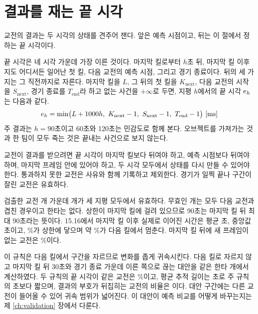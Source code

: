 \section{결과를 재는 끝 시각}
\label{sec:eng-endpoint}

교전의 결과는 두 시각의 상태를 견주어 잰다. 앞은 예측 시점이고, 뒤는 이 절에서 정하는 끝 시각이다.

끝 시각은 네 시각 가운데 가장 이른 것이다. 마지막 킬로부터 $h$초 뒤, 마지막 킬 이후 지도 어디서든 일어난 첫 킬, 다음 교전의 예측 시점, 그리고 경기 종료이다. 뒤의 세 가지는 그 직전까지로 자른다. 마지막 킬을 $L$, 그 뒤의 첫 킬을 $K_{\mathrm{next}}$, 다음 교전의 시작을 $S_{\mathrm{next}}$, 경기 종료를 $T_{\mathrm{end}}$라 하고 없는 사건을 $+\infty$로 두면, 지평 $h$에서의 끝 시각 $e_{h}$는 다음과 같다.
\begin{equation}
  e_{h} = \min\bigl(L + 1000h,\ K_{\mathrm{next}} - 1,\ S_{\mathrm{next}} - 1,\ T_{\mathrm{end}} - 1\bigr)\ \text{[ms]}
  \label{eq:endpoint}
\end{equation}
주 결과는 $h = 90$초이고 60초와 120초는 민감도로 함께 본다. 오브젝트를 가져가는 것과 한 팀이 모두 죽는 것은 끝내는 사건으로 보지 않는다.

교전이 결과를 받으려면 끝 시각이 마지막 킬보다 뒤여야 하고, 예측 시점보다 뒤여야 하며, 마지막 프레임 안에 있어야 하고, 두 시각 모두에서 상태를 다시 만들 수 있어야 한다. 통과하지 못한 교전은 사유와 함께 기록하고 제외한다. 경기가 일찍 끝나 구간이 잘린 교전은 유효하다.

검출한 교전 \numEngDetected{}개 가운데 \numEngValid{}개가 세 지평 모두에서 유효하다. 무효인 \numEngInvalid{}개는 모두 다음 교전과 겹친 경우이고 한타는 없다. 상한이 마지막 킬에 걸려 있으므로 90초는 마지막 킬 뒤 최대 90초라는 뜻이다. 15.16에서 마지막 킬 이후 실제로 이어진 시간은 평균 \followupMean{}초, 중앙값 \followupMedian{}초이고, \shareCapReached{}\%가 상한에 닿으며 약 \shareNextKillStop{}\%가 다음 킬에서 멈춘다. 마지막 킬 뒤에 새 프레임이 없는 교전은 \shareNoNewFrame{}\%이다.

이 규칙은 다음 킬에서 구간을 자르므로 변화를 좁게 귀속시킨다. 다음 킬로 자르지 않고 마지막 킬 뒤 30초와 경기 종료 가운데 이른 쪽으로 끊는 대안을 같은 한타 \efN{}개에서 계산하였다. 두 규칙의 끝 시각이 같은 교전은 \efSameEp{}\%이고, 평균 추적 길이는 \efFollowFixed{}초로 주 규칙의 \efFollowH{}초보다 짧으며, 결과의 부호가 뒤집히는 교전의 비율은 \efFlip{}이다. 대안 구간에는 다른 교전이 들어올 수 있어 귀속 범위가 넓어진다. 이 대안이 예측 비교를 어떻게 바꾸는지는 제 \ref{ch:validation} 장에서 다룬다.

